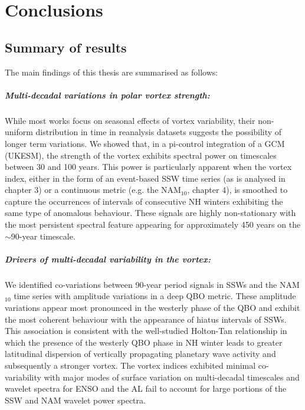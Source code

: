 \chapter{Conclusions}
\label{cha:conclusions}

\section{Summary of results}

The main findings of this thesis are summarised as follows: 

\paragraph{Multi-decadal variations in polar vortex strength:}
While most works focus on seasonal effects of vortex variability, their non-uniform distribution in time in reanalysis datasets suggests the possibility of longer term variations. We showed that, in a pi-control integration of a GCM (UKESM), the strength of the vortex exhibits spectral power on timescales between 30 and 100 years. This power is particularly apparent when the vortex index, either in the form of an event-based SSW time series (as is analysed in chapter 3) or a continuous metric (e.g. the NAM$_{10}$, chapter 4), is smoothed to capture the occurrences of intervals of consecutive NH winters exhibiting the same type of anomalous behaviour. These signals are highly non-stationary with the most persistent spectral feature appearing for approximately 450 years on the $\sim$90-year timescale. 

\paragraph{Drivers of multi-decadal variability in the vortex:}
We identified co-variations between 90-year period signals in SSWs and the NAM$_{10}$ time series with amplitude variations in a deep QBO metric. These amplitude variations appear most pronounced in the westerly phase of the QBO and exhibit the most coherent behaviour with the appearance of hiatus intervals of SSWs. This association is consistent with the well-studied Holton-Tan relationship in which the presence of the westerly QBO phase in NH winter leads to greater latitudinal dispersion of vertically propagating planetary wave activity and subsequently a stronger vortex. The vortex indices exhibited minimal co-variability with major modes of surface variation on multi-decadal timescales and wavelet spectra for ENSO and the AL fail to account for large portions of the SSW and NAM wavelet power spectra.

